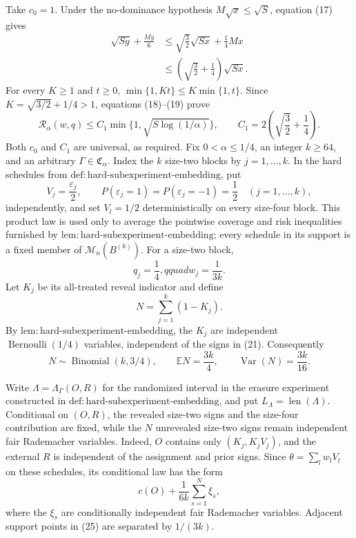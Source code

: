 Take \(c_0=1\).  Under the no-dominance hypothesis
\(M\sqrt{x}\le\sqrt S\), equation (17) gives
\[
\begin{aligned}
 \sqrt{Sy}+\frac{My}{6}
 &\le\sqrt{\frac32}\sqrt{Sx}+\frac14Mx\\
 &\le\left(\sqrt{\frac32}+\frac14\right)\sqrt{Sx}.
\end{aligned}
\tag{19}
\]
For every \(K\ge1\) and \(t\ge0\),
\(\min\{1,Kt\}\le K\min\{1,t\}\).  Since
\(K=\sqrt{3/2}+1/4>1\), equations (18)--(19) prove
\[
 \mathcal R_\alpha(w,q)
 \le C_1\min\{1,\sqrt{S\log(1/\alpha)}\},
 \qquad
 C_1=2\left(\sqrt{\frac32}+\frac14\right).
\tag{20}
\]
Both \(c_0\) and \(C_1\) are universal, as required.
Fix \(0<\alpha\le1/4\), an integer \(k\ge64\), and an arbitrary
\(\Gamma\in\mathfrak C_\alpha\).  Index the \(k\) size-two blocks by
\(j=1,\ldots,k\).  In the hard schedules from
\(\mathrm{def{:}hard\text{-}subexperiment\text{-}embedding}\), put
\[
 V_j=\frac{\varepsilon_j}{2},\qquad
 P(\varepsilon_j=1)=P(\varepsilon_j=-1)=\frac12
 \quad(j=1,\ldots,k),
\tag{21}
\]
independently, and set \(V_l=1/2\) deterministically on every
size-four block.  This product law is used only to average the
pointwise coverage and risk inequalities furnished by
\(\mathrm{lem{:}hard\text{-}subexperiment\text{-}embedding}\); every
schedule in its support is a fixed member of
\(\mathcal M_n(B^{(k)})\).  For a size-two block,
\[
 q_j=\frac14,qquad w_j=\frac1{3k}.
\tag{22}
\]
Let \(K_j\) be its all-treated reveal indicator and define
\[
 N=\sum_{j=1}^k(1-K_j).
\tag{23}
\]
By \(\mathrm{lem{:}hard\text{-}subexperiment\text{-}embedding}\),
the \(K_j\) are independent \(\operatorname{Bernoulli}(1/4)\)
variables, independent of the signs in (21).  Consequently
\[
 N\sim\operatorname{Binomial}(k,3/4),\qquad
 \mathbb EN=\frac{3k}{4},\qquad
 \operatorname{Var}(N)=\frac{3k}{16}.
\tag{24}
\]

Write \(\Lambda=\Lambda_\Gamma(O,R)\) for the randomized interval in
the erasure experiment constructed in
\(\mathrm{def{:}hard\text{-}subexperiment\text{-}embedding}\), and
put \(L_\Lambda=\operatorname{len}(\Lambda)\).  Conditional on
\((O,R)\), the revealed size-two signs and the size-four contribution
are fixed, while the \(N\) unrevealed size-two signs remain independent
fair Rademacher variables.  Indeed, \(O\) contains only
\((K_j,K_jV_j)\), and the external \(R\) is independent of the
assignment and prior signs.  Since \(\theta=\sum_lw_lV_l\) on these
schedules, its conditional law has the form
\[
 c(O)+\frac1{6k}\sum_{s=1}^{N}\xi_s,
\tag{25}
\]
where the \(\xi_s\) are conditionally independent fair Rademacher
variables.  Adjacent support points in (25) are separated by
\(1/(3k)\).

